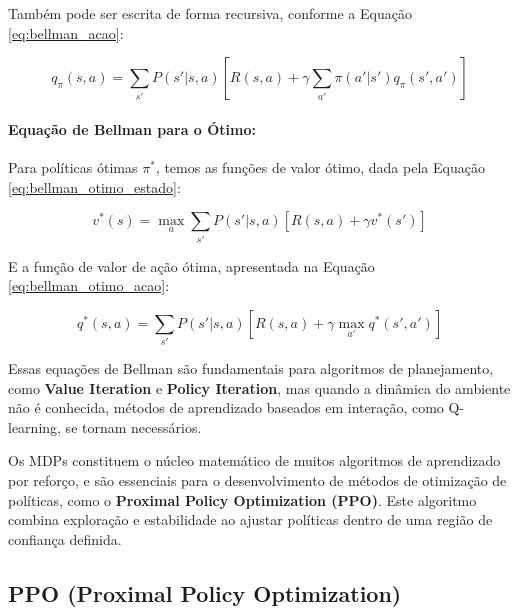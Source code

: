 Também pode ser escrita de forma recursiva, conforme a Equação \ref{eq:bellman_acao}:

\begin{equation}
\label{eq:bellman_acao}
q_\pi(s, a) = \sum_{s'} P(s'|s, a) \left[ R(s, a) + \gamma \sum_{a'} \pi(a'|s') q_\pi(s', a') \right]
\end{equation}

\paragraph{Equação de Bellman para o Ótimo:}
Para políticas ótimas \(\pi^*\), temos as funções de valor ótimo, dada pela Equação \ref{eq:bellman_otimo_estado}:

\begin{equation}
\label{eq:bellman_otimo_estado}
v^*(s) = \max_a \sum_{s'} P(s'|s, a) \left[ R(s, a) + \gamma v^*(s') \right]
\end{equation}

E a função de valor de ação ótima, apresentada na Equação \ref{eq:bellman_otimo_acao}:

\begin{equation}
\label{eq:bellman_otimo_acao}
q^*(s, a) = \sum_{s'} P(s'|s, a) \left[ R(s, a) + \gamma \max_{a'} q^*(s', a') \right]
\end{equation}

Essas equações de Bellman são fundamentais para algoritmos de planejamento, como \textbf{Value Iteration} e \textbf{Policy Iteration}, mas quando a dinâmica do ambiente não é conhecida, métodos de aprendizado baseados em interação, como Q-learning, se tornam necessários.

Os MDPs constituem o núcleo matemático de muitos algoritmos de aprendizado por reforço, e são essenciais para o desenvolvimento de métodos de otimização de políticas, como o \textbf{Proximal Policy Optimization (PPO)}. Este algoritmo combina exploração e estabilidade ao ajustar políticas dentro de uma região de confiança definida.

\subsection{PPO (Proximal Policy Optimization)}
\label{subsec:ppo}


